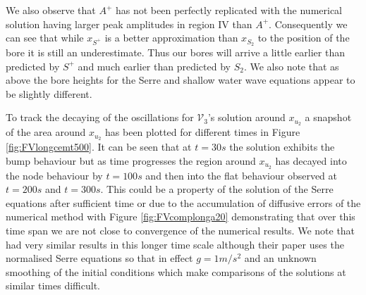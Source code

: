 \documentclass[SingleSpace,12pt,Journal]{Serre_ASCE}
\begin{document}
We also observe that $A^+$ has not been perfectly replicated with the numerical solution having larger peak amplitudes in region IV than $A^+$. Consequently we can see that while $x_{S^+}$ is a better approximation than $x_{S_2}$ to the position of the bore it is still an underestimate. Thus our bores will arrive a little earlier than predicted by $S^+$ and much earlier than predicted by $S_2$. We also note that as above the bore heights for the Serre and shallow water wave equations appear to be slightly different.

To track the decaying of the oscillations for $\mathcal{V}_3$'s solution around $x_{u_2}$ a snapshot of the area around $x_{u_2}$ has been plotted for different times in Figure \ref{fig:FVlongcemt500}. It can be seen that at $t =30s$ the solution exhibits the bump behaviour but as time progresses the region around $x_{u_2}$ has decayed into the node behaviour by $t=100s$ and then into the flat behaviour observed at $t=200s$ and $t=300s$. This could be a property of the solution of the Serre equations after sufficient time or due to the accumulation of diffusive errors of the numerical method with Figure \ref{fig:FVcomplonga20} demonstrating that over this time span we are not close to convergence of the numerical results. We note that  had very similar results in this longer time scale although their paper uses the normalised Serre equations so that in effect $g=1m/s^2$ and an unknown smoothing of the initial conditions which make comparisons of the solutions at similar times difficult.   
\end{document}
